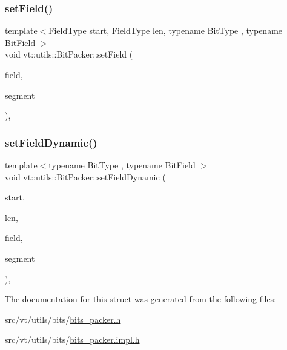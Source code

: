 \subsubsection{\texorpdfstring{set\+Field()}{setField()}}
{\footnotesize\ttfamily template$<$Field\+Type start, Field\+Type len, typename Bit\+Type , typename Bit\+Field $>$ \\
void vt\+::utils\+::\+Bit\+Packer\+::set\+Field (\begin{DoxyParamCaption}\item[{Bit\+Field \&}]{field,  }\item[{Bit\+Type const \&}]{segment }\end{DoxyParamCaption})\hspace{0.3cm}{\ttfamily [inline]}, {\ttfamily [static]}}

\mbox{\label{structvt_1_1utils_1_1_bit_packer_a9d000b5dcc34456e43cbff50fafa3fb9}} 
\subsubsection{\texorpdfstring{set\+Field\+Dynamic()}{setFieldDynamic()}}
{\footnotesize\ttfamily template$<$typename Bit\+Type , typename Bit\+Field $>$ \\
void vt\+::utils\+::\+Bit\+Packer\+::set\+Field\+Dynamic (\begin{DoxyParamCaption}\item[{\hyperlink{structvt_1_1utils_1_1_bit_packer_a23024285425933c1f10c8fc3942f9beb}{Field\+Type}}]{start,  }\item[{\hyperlink{structvt_1_1utils_1_1_bit_packer_a23024285425933c1f10c8fc3942f9beb}{Field\+Type}}]{len,  }\item[{Bit\+Field \&}]{field,  }\item[{Bit\+Type const \&}]{segment }\end{DoxyParamCaption})\hspace{0.3cm}{\ttfamily [inline]}, {\ttfamily [static]}}



The documentation for this struct was generated from the following files\+:\begin{DoxyCompactItemize}
\item 
src/vt/utils/bits/\hyperlink{bits__packer_8h}{bits\+\_\+packer.\+h}\item 
src/vt/utils/bits/\hyperlink{bits__packer_8impl_8h}{bits\+\_\+packer.\+impl.\+h}\end{DoxyCompactItemize}
